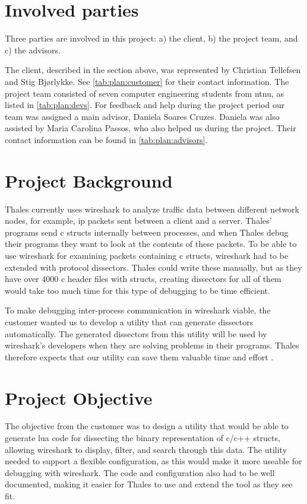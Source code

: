 \section{Involved parties}
Three parties are involved in this project: a) the client, b) the project team, and c) the advisors.

The client, described in the section above, was represented by Christian Tellefsen and Stig Bjørlykke. See \autoref{tab:plan:customer} for their contact information.
The project team consisted of seven computer engineering students from \Gls{ntnu}, as listed in \autoref{tab:plan:devs}.
For feedback and help during the project period our team was assigned a main advisor, Daniela Soares Cruzes.
Daniela was also assisted by Maria Carolina Passos, who also helped us during the project. Their contact information can be found in \autoref{tab:plan:advisors}.
\section{Project Background}
Thales currently uses \Gls{wireshark} to analyze traffic data between different network nodes, for example, \Gls{ip} \glspl{packet} sent between a client and a server.
Thales' programs send \Gls{c} \glspl{struct} internally between processes, and when Thales debug their programs they want to look at the contents of these \glspl{packet}.
To be able to use \Gls{wireshark} for examining \glspl{packet} containing \Gls{c} \glspl{struct}, \Gls{wireshark} had to be extended with \gls{protocol} \glspl{dissector}.
Thales could write these manually, but as they have over 4000 \Gls{c} header files with structs, creating \glspl{dissector} for
all of them would take too much time for this type of debugging to be time efficient. 

To make debugging inter-process communication in \Gls{wireshark} viable, the customer wanted us to develop a \gls{utility} that can generate \glspl{dissector} automatically.
The generated \glspl{dissector} from this \gls{utility} will be used by \Gls{wireshark}'s developers when they are solving problems in their programs.
Thales therefore expects that our \gls{utility} can save them valuable time and effort .

\section{Project Objective}
The objective from the customer was to design a \gls{utility} that would be able to generate \Gls{lua} code for dissecting the \gls{binary} representation
of \Gls{c}/\Gls{c++} \glspl{struct}, allowing \Gls{wireshark} to display, filter, and search through this data.
The \gls{utility} needed to support a flexible configuration, as this would make it more useable for debugging with \Gls{wireshark}. 
The code and configuration also had to be well documented, making it easier for Thales to use and extend the tool as they see fit.

